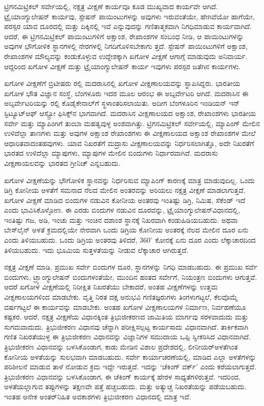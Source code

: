 ಟ್ರಿಗನಮಿಟ್ರಿಕಲ್​ ಸರ್ವೇಯಲ್ಲಿ, ನಕ್ಷತ್ರ ವೀಕ್ಷಣೆ ಕಾರ್ಯವೂ ಕೂಡ ಮುಖ್ಯವಾದ ಕಾರ್ಯವೇ ಆಗಿದೆ. ಟ್ರೈಯಾಂಗ್ಯುಲೇಷನ್​ ಕಾರ್ಯವು, ಸ್ಟೇಷನ್​ ಪಾಯಿಂಟುಗಳನ್ನು ಅವುಗಳು ಇರುವಂತೆಯೇ, ಹೇಗಿವೆಯೋ ಹಾಗೆಯೇ, ಪರಸ್ಪರ ಯಾವ ದೂರದಲ್ಲಿ ಮತ್ತು ದಿಕ್ಕಿನಲ್ಲಿ ಇವೆ ಎನ್ನುವುದನ್ನು ಗಣಿತಾತ್ಮಕವಾಗಿ ನಿಗಧಿಮಾಡುವ ಕಾರ್ಯವಾಗಿದೆ. ಆದರೆ, ಈ ಟ್ರಿಗನಮಿಟ್ರಿಕಲ್​ ಪಾಯಿಂಟುಗಳಿಗೆ ಅಕ್ಷಾಂಶ, ರೇಖಾಂಶಗಳ ಸಂಬಂಧ ನೀಡಿ, ಆ ಪಾಯಿಂಟುಗಳನ್ನು ಅವುಗಳ ಭೌಗೋಳಿಕ ಸ್ಥಾನಗಳಲ್ಲಿ ನೇರಗಳಲ್ಲಿ ನಿಗದಿಗೊಳಿಸಬೇಕಾಗು ತ್ತದೆ. ಸ್ಟೇಷನ್​ ಪಾಯಿಂಟುಗಳಿಗೆ ಅಕ್ಷಾಂಶ, ರೇಖಾಂಶಗಳ ಮೌಲ್ಯವನ್ನು ಕಂಡುಕೊಳ್ಳುವ ಉದ್ದೇಶಕ್ಕಾಗಿ ಖಗೋಳ ವೀಕ್ಷಣೆ ಆಗಾಗ್ಗೆ ಮಾಡುವುದು ಅನಿವಾರ್ಯ. ಆದ್ದರಿಂದ ಖಗೋಳ ವೀಕ್ಷಣೆ ಮತ್ತು ಟ್ರೈಯಾಂಗ್ಯುಲೇಷನ್​ ಕಾರ್ಯ ಇವುಗಳು ಪರಸ್ಪರ ಜತೆಗಿನ ಕಾರ್ಯಗಳು.

ಖಗೋಳ ವೀಕ್ಷಣೆಗೆ ಬ್ರಿಟೀಷರು ರಲ್ಲಿ ಮದರಾಸಿನಲ್ಲಿ ಖಗೋಳ ವೀಕ್ಷಣಾಲಯವನ್ನು ಸ್ಥಾಪಿಸಿದ್ದರು. ಭಾರತೀಯ ಖಗೋಳ ಭೌತ ವಿಜ್ಞಾನ ಸಂಸ್ಥೆ, ಬೆಂಗಳೂರು ಇದರ ಮೂಲ ಆರಂಭ ಈ ಅಬ್ಸರ್ವೇಟರಿ ಆಗಿದೆ. ಮದರಾಸಿನ ಈ ಅಬ್ಸರ್ವೇಟರಿಯನ್ನು ರಲ್ಲಿ ಕೊಡೈಕೇನಾಲ್​ಗೆ ಸ್ಥಳಾಂತರಿಸಲಾಯಿತು. ಅದೀಗ ಬೆಂಗಳೂರಿನ ಇಂಡಿಯನ್​ ಇನ್​ಸ್ಟಿಟ್ಯೂಟ್​ ಆಫ್​ ಆಸ್ಟ್ರೋ ಫಿಸಿಕ್ಸ್​ನ ಭಾಗವಾಗಿದೆ. ಮದರಾಸಿನ ವೀಕ್ಷಣಾಲಯದ ಅಕ್ಷಾಂಶ, ರೇಖಾಂಶಗಳು ಭಾರತೀಯ ಸರ್ವೇ ಮತ್ತು ಮ್ಯಾಪಿಂಗಿಗೆ ತುಂಬಾ ಮಹತ್ವವುಳ್ಳ ಅಂಶವಾಗಿತ್ತು. ಟ್ರಿಗನಮಿಟ್ರಿಕಲ್​ ಸರ್ವೇಯಲ್ಲಿ, ಮ್ಯಾಪಿಂಗ್​ ಮೇಲಿನ ಉಳಿದೆಲ್ಲಾ ತಾಣಗಳು ಮತ್ತು ಅವುಗಳ ಅಕ್ಷಾಂಶ ರೇಖಾಂಶಗಳು ಈ ವೀಕ್ಷಣಾಲಯದ ಅಕ್ಷಾಂಶ ರೇಖಾಂಶಗಳ ಮೇಲೆ ಆಧಾರಿತವಾದಂತಹವುಗಳು. ಯಾವ ನಿಖರತೆಗೆ ಮದ್ರಾಸು ವೀಕ್ಷಣಾಲಯವನ್ನು ನಿರ್ಧರಿಸಲಾಗಿತ್ತೊ, ಅದೇ ನಿಖರತೆಗೆ ಭಾರತದ ಉಳಿದೆಲ್ಲಾ ಮ್ಯಾಪುಗಳು, ಮ್ಯಾಪುಗಳ ಮೇಲಿನ ಬಿಂದುಗಳು ನಿರ್ಧಾರವಾಗಿವೆ. ಮದರಾಸು ವೀಕ್ಷಣಾಯಲವನ್ನು ಭಾರತದ ಗ್ರೀನಿಚ್​ ಎನ್ನಬಹುದು.

ಖಗೋಳ ವೀಕ್ಷಣೆಯನ್ನು ಭೌಗೋಳಿಕ ಸ್ಥಾನವನ್ನು ನಿರ್ಧರಿಸುವ ಮ್ಯಾಪಿಂಗ್​ ಕಾರಣಕ್ಕೆ ಮಾತ್ರ ಮಾಡುವುದಿಲ್ಲ. ಒಂದು ಡಿಗ್ರಿ ಕೋನೀಯ ಅಳತೆಗೆ ಸಮನಾದ ನೆಲದ ಮೇಲಿನ ಅಂತರವನ್ನು ಅರಿಯಲು ನಕ್ಷತ್ರ ವೀಕ್ಷಣೆ ಮಾಡಲಾಗುತ್ತದೆ. ಖಗೋಳ ವೀಕ್ಷಣೆ ಮಾಡಿದ  ಬಿಂದುಗಳ ನಡುವಿನ ಕೋನೀಯ ಅಂತರವು ಇಂತಿಷ್ಟು ಡಿಗ್ರಿ, ನಿಮಿಷ, ಸೆಕೆಂಡ್​ ಇದೆ ಎಂದು ಭಾವಿಸಿಕೊಳ್ಳೋಣ. ಈ ಎರಡು ಬಿಂದುಗಳ ನಡುವಿನ ದೂರವನ್ನು, ಟ್ರೈಯಾಂಗ್ಯುಲೇಷನ್​ ವಿಧಾನದಲ್ಲಿ, ಇಂತಿಷ್ಟು ಗಜ, ಅಡಿ, ಇಂಚು ಮತ್ತು ಇಂಚಿನ ದಶಾಂಶ ಸ್ಥಾನಕ್ಕೆ ನಿಖರವಾಗಿ ಕಂಡುಹಿಡಿಯಬಹುದು. ಅಥವಾ ಬೇಸ್‌ಲೈನ್​ ಅಳತೆ ಕ್ರಮದಲ್ಲಿಯೇ ನೇರವಾಗಿ ಒಂದು ಡಿಗ್ರಿಯ ಕೋನೀಯ ಅಂತರಕ್ಕೆ ನೆಲದ ಮೇಲಿನ ದೂರ ಏನು ಎಂದು ತಿಳಿಯಬಹುದು. ಒಂದು ಡಿಗ್ರಿಯ ಅಂತರವು ತಿಳಿದರೆ, $360^\circ$ ಕೋನಕ್ಕೆ ಏನು ದೂರ ಎಂದು ಲೆಕ್ಕಾಚಾರದಿಂದ ತಿಳಿಯಬಹುದು. ಇದು ಭೂಮಿಯ ಸುತ್ತಳತೆಯನ್ನು ನೀಡುವ ಲೆಕ್ಕಾಚಾರ ಆಗಿರುತ್ತದೆ.

ನಕ್ಷತ್ರ ವೀಕ್ಷಣೆ ಮಾಡಿ, ಪ್ರಮುಖ ಸರ್ವೇ ಬಿಂದುಗಳ ದೂರ, ಸ್ಥಾನಗಳನ್ನು ನಿಗಧಿ ಮಾಡಬಹುದು. ಈ ಪ್ರಮುಖ ಸರ್ವೆ ಬಿಂದುಗಳು, ಟ್ರ್ಯಾಂಗ್ಯುಲೇಷನ್​ ಬಿಂದುಗಳಂತೆಯೇ, ಮುಂದಿನ ಹಂತದ ಸರ್ವೇಗೆ, ನಿಯಂತ್ರಣ ಬಿಂದುಗಳು ಆಗುತ್ತವೆ. ಆದರೆ ಖಗೋಳ ವೀಕ್ಷಣೆಯಲ್ಲಿ ನಿರೀಕ್ಷಿತ ನಿಖರತೆಯು ಬೇಕಾದರೆ, ಅಂತಹ ವೀಕ್ಷಣೆಗಳನ್ನು ಉತ್ತಮ ವೀಕ್ಷಣಾಲಯಗಳಿಂದ ಮಾಡಬೇಕು. ವೃತ್ತಿ ನಿರತ ದಕ್ಷ ಅನುಭವಿ ಗಣಿತಜ್ಞರುಗಳು ತಿಂಗಳುಗಟ್ಟಲೆ, ಕೆಲವೊಮ್ಮೆ ವರ್ಷಗಟ್ಟಲೆ ಈ ಕಾರ್ಯವನ್ನು ಮಾಡಬೇಕು. ಅಂತಹ ಖಗೋಳ ವೀಕ್ಷಣಾಲಯಗಳ ನಿರ್ಮಾಣ, ನಿರ್ವಹಣೆಯೂ ಕಷ್ಟಕರ. ಆದರೆ, ನಕ್ಷತ್ರ ವೀಕ್ಷಣೆಯ ವಿಧಾನಕ್ಕಿಂತ ತ್ರಿಭುಜೀಕರಣದ ಜಾಮಿತಿಯ ಮಾರ್ಗವು ಸರಳವಾದುದು ಮತ್ತು ಸುಗಮವಾದುದು. ತ್ರಿಭುಜೀಕರಣ ವಿಧಾನವು ಚೆನ್ನಾಗಿ ಪರೀಕ್ಷಿಸಲ್ಪಟ್ಟ ಕಾರ್ಯಸಾದು ವಿಧಾನವಾಗಿದೆ. ತಾರ್ಕಿಕವಾಗಿ ಗಣಿತ ನಿಖರತೆಯುಳ್ಳ ಈ ತ್ರಿಭುಜೀಕರಣ ವಿಧಾನವನ್ನು ವಿಜ್ಞಾನಿಗಳ ಸಮುದಾಯ ಒಪ್ಪಿ ಸ್ವೀಕರಿಸಿದ ವಿಧಾನವಾಗಿದೆ. ತ್ರಿಭುಜೀಕರಣ ವಿಧಾನವನ್ನು ಬಳಸಿಕೊಂಡಾಗ, ಕಾಡು ಮೇಡಿನ ವಿಶಾಲ ಪ್ರದೇಶದಲ್ಲಿ, ಲೀನೀಯರ್​ ಅಳತೆಗಿಂತ ಕೋನೀಯ ಅಳತೆಯನ್ನು ಸುಲಭವಾಗಿ ಮಾಡಬಹುದು. ಸರ್ವೇ ಕಾರ್ಯಾಚರಣೆಯಲ್ಲಿ, ಮಾಡಿದ ಎಲ್ಲಾ ಅಳತೆಗಳನ್ನು ಪರಿಶೀಲನೆ ಮಾಡುವ ತಾಳೆ ನೋಡುವ ಕ್ರಮ ಇದ್ದೇ ಇರುತ್ತದೆ. ಇದನ್ನು ‘ಚೆಕಿಂಗ್​ ವರ್ಕ್’ ಎಂದು ಕರೆಯಲಾಗುತ್ತದೆ. ತ್ರಿಭುಜೀಕರಣ ವಿಧಾನವನ್ನು ಬಳಸಿಕೊಂಡಾಗ, ಈ ಚೆಕಿಂಗ್​ ಕಾರ್ಯಕ್ಕೆ ಹೇರಳ ಸಾಧ್ಯತೆಗಳಿರುತ್ತವೆ. ಇದರಿಂದ, ಅಳತೆಯಲ್ಲಾಗುವ ತಪ್ಪುಗಳನ್ನು ತಕ್ಷಣವೇ ಪತ್ತೆ ಹಚ್ಚಬಹುದು. ಮತ್ತು ಅತ್ಯುಚ್ಚ ನಿಖರತೆಯನ್ನು ಪಡೆಯಬಹುದು. ಇಂತಹ ಅನೇಕ ಅಂತರ್​ನಿಹಿತ ಅವಕಾಶಗಳು ತ್ರಿಭುಜೀಕರಣ ವಿಧಾನದಲ್ಲಿ ಮಾತ್ರ ಇವೆ.

